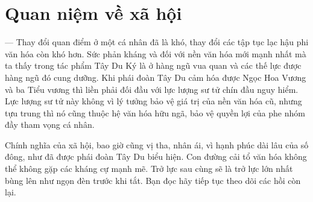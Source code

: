 \section{Quan niệm về xã hội} %
\label{sec:88_89_90_xa_hoi}

— Thay đổi quan điểm ở một cá nhân đã là khó, thay đổi các tập tục lạc hậu phi văn hóa còn khó hơn. Sức phản kháng và đối với nền văn hóa mới mạnh nhất mà ta thấy trong tác phẩm Tây Du Ký là ở hàng ngũ vua quan và các thế lực được hàng ngũ đó cung dưỡng. Khi phái đoàn Tây Du cảm hóa được Ngọc Hoa Vương và ba Tiểu vương thì liền phải đối đầu với lực lượng sư tử chín đầu nguy hiểm. Lực lượng sư tử này không vì lý tưởng bảo vệ giá trị của nền văn hóa cũ, nhưng tựu trung thì nó cũng thuộc hệ văn hóa hữu ngã, bảo vệ quyền lợi của phe nhóm đầy tham vọng cá nhân.

Chính nghĩa của xã hội, bao giờ cũng vị tha, nhân ái, vì hạnh phúc dài lâu của số đông, như đã được phái đoàn Tây Du biểu hiện. Con đường cải tổ văn hóa không thể không gặp các kháng cự mạnh mẽ. Trở lực sau cùng sẽ là trở lực lớn nhất bùng lên như ngọn đèn trước khi tắt. Bạn đọc hãy tiếp tục theo dõi các hồi còn lại.
